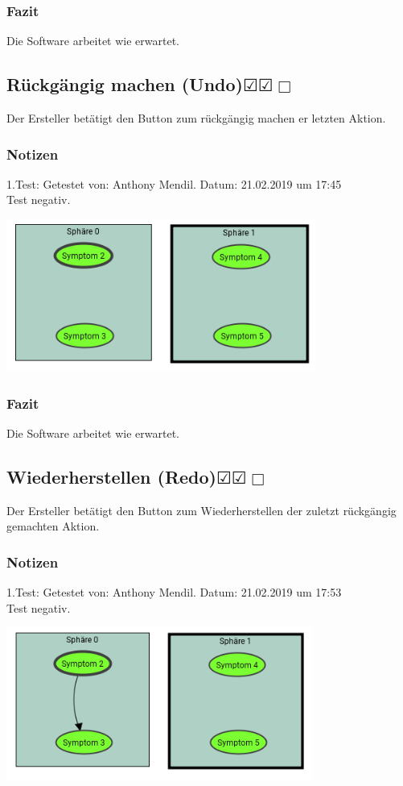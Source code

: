 \documentclass{scrartcl}
\newcommand{\subsectiont}[2]{\subsection[#1]{#1{\normalsize\normalfont #2}}}
\newcommand{\leer}{$\Box$}
\newcommand{\ok}{$\CheckedBox$}
\begin{document}
\subsubsection{Fazit}
Die Software arbeitet wie erwartet.

\subsectiont{Rückgängig machen (Undo)}{\dotfill\ok\ok\leer}
Der Ersteller betätigt den Button zum rückgängig machen er letzten Aktion.
\subsubsection{Notizen}
1.Test: Getestet von: Anthony Mendil. Datum: 21.02.2019 um 17:45 \\
Test negativ.
\begin{center}
\includegraphics[height=5cm]{1_7neu.PNG}
\end{center}
\subsubsection{Fazit}
Die Software arbeitet wie erwartet.

\subsectiont{Wiederherstellen (Redo)}{\dotfill\ok\ok\leer}
Der Ersteller betätigt den Button zum Wiederherstellen der zuletzt rückgängig gemachten Aktion. 
\subsubsection{Notizen}
1.Test: Getestet von: Anthony Mendil. Datum: 21.02.2019 um 17:53 \\
Test negativ.
\begin{center}
\includegraphics[height=5cm]{1_8neu.PNG}
\end{center}
\end{document}
